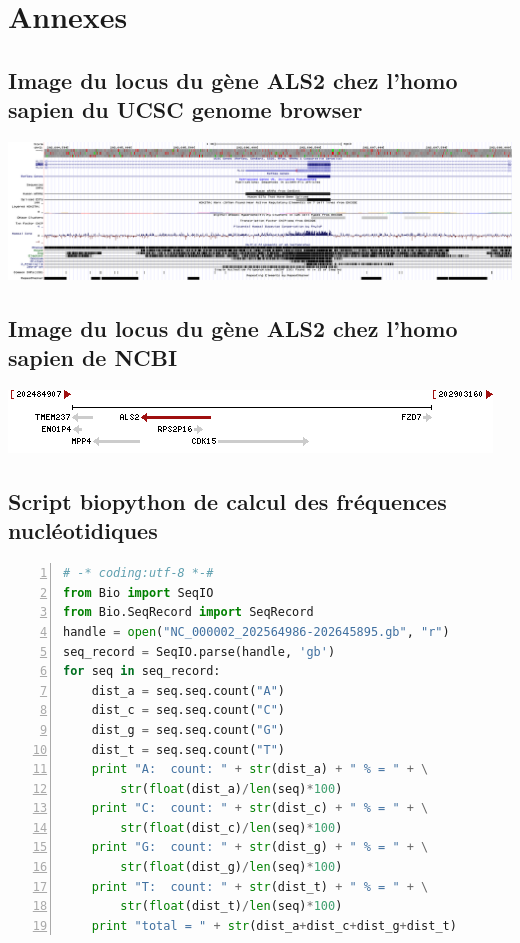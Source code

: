 \documentclass[11pt]{article} %
\begin{document}
\appendix
\section{Annexes}
\subsection{Image du locus du gène ALS2 chez l'homo sapien du UCSC genome browser}\label{1}
\includegraphics[width=\linewidth]{annexes/annexe1_ucsc.png}

\subsection{Image du locus du gène ALS2 chez l'homo sapien de NCBI}\label{2}
\includegraphics{annexes/annexe1_ncbi_als2.png}

\subsection{Script biopython de calcul des fréquences nucléotidiques}\label{3}
\begin{lstlisting}[frame=single,numbers=left,language=Python]
# -* coding:utf-8 *-#
from Bio import SeqIO
from Bio.SeqRecord import SeqRecord
handle = open("NC_000002_202564986-202645895.gb", "r")
seq_record = SeqIO.parse(handle, 'gb')
for seq in seq_record:
    dist_a = seq.seq.count("A")
    dist_c = seq.seq.count("C")
    dist_g = seq.seq.count("G")
    dist_t = seq.seq.count("T")
    print "A:  count: " + str(dist_a) + " % = " + \
        str(float(dist_a)/len(seq)*100)
    print "C:  count: " + str(dist_c) + " % = " + \
        str(float(dist_c)/len(seq)*100)
    print "G:  count: " + str(dist_g) + " % = " + \
        str(float(dist_g)/len(seq)*100)
    print "T:  count: " + str(dist_t) + " % = " + \
        str(float(dist_t)/len(seq)*100)
    print "total = " + str(dist_a+dist_c+dist_g+dist_t)
\end{lstlisting}
\end{document}
